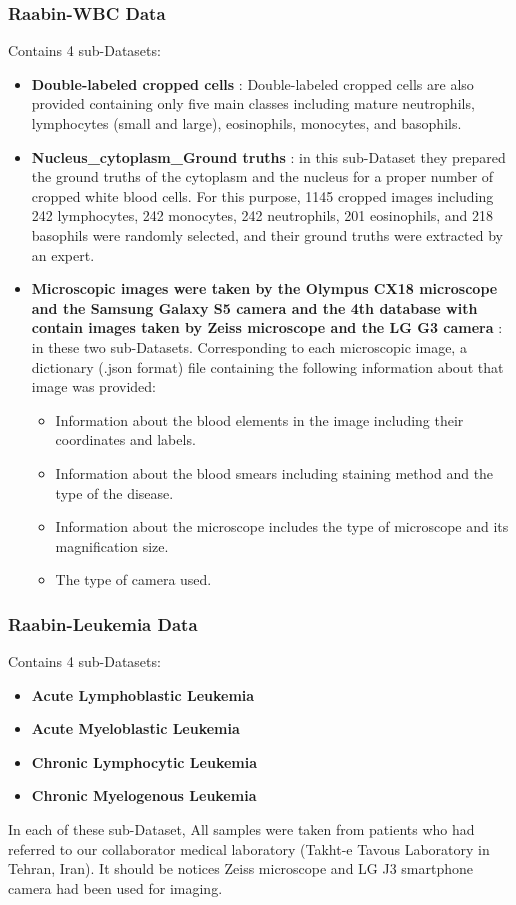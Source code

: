 \subsubsection{Raabin-WBC Data}
Contains 4 sub-Datasets:
\begin{itemize}
    \item \textbf{Double-labeled cropped cells} : Double-labeled cropped cells are also provided containing only five main classes including mature neutrophils, lymphocytes (small and large), eosinophils, monocytes, and basophils. 
    \item \textbf{Nucleus\_cytoplasm\_Ground truths} : in this sub-Dataset they prepared the ground truths of the cytoplasm and the nucleus for a proper number of cropped white blood cells. For this purpose, 1145 cropped images including 242 lymphocytes, 242 monocytes, 242 neutrophils, 201 eosinophils, and 218 basophils were randomly selected, and their ground truths were extracted by an expert.
    \item \textbf{Microscopic images were taken by the Olympus CX18 microscope and the Samsung Galaxy S5 camera and the 4th database with contain images taken by Zeiss microscope and the LG G3 camera } : in these two sub-Datasets. Corresponding to each microscopic image, a dictionary (.json format) file containing the following information about that image was provided:
    \begin{itemize}
        \item Information about the blood elements in the image including their coordinates and labels.
        \item Information about the blood smears including staining method and the type of the disease.
        \item Information about the microscope includes the type of microscope and its magnification size.
        \item The type of camera used.
    \end{itemize}
\end{itemize}

\subsubsection{Raabin-Leukemia Data}
Contains 4 sub-Datasets:
\begin{itemize}
    \item \textbf{Acute Lymphoblastic Leukemia}  
    \item \textbf{Acute Myeloblastic Leukemia} 
    \item \textbf{Chronic Lymphocytic Leukemia}
    \item \textbf{Chronic Myelogenous Leukemia}
\end{itemize}
In each of these sub-Dataset, All samples were taken from patients who had referred to our collaborator medical laboratory (Takht-e Tavous Laboratory in Tehran, Iran). It should be notices Zeiss microscope and LG J3 smartphone camera had been used for imaging.
